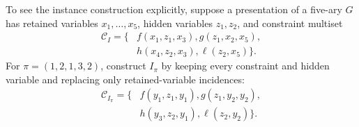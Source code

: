 \documentclass[11pt]{article}
\theoremstyle{plain}
\theoremstyle{definition}
\theoremstyle{remark}
\begin{document}
To see the instance construction explicitly, suppose a presentation of a
five-ary $G$ has retained variables $x_1,\ldots,x_5$, hidden variables
$z_1,z_2$, and constraint multiset
\begin{equation*}
\begin{aligned}
  \mathcal C_I=\{&f(x_1,z_1,x_3),
                  g(z_1,x_2,x_5),\\
                 &h(x_4,z_2,x_3),
                  \ell(z_2,x_5)\}.
\end{aligned}
\end{equation*}
For $\pi=(1,2,1,3,2)$, construct $I_\pi$ by keeping every constraint and
hidden variable and replacing only retained-variable incidences:
\[
\begin{aligned}
  \mathcal C_{I_\pi}=\{&f(y_1,z_1,y_1),
                        g(z_1,y_2,y_2),\\
                       &h(y_3,z_2,y_1),
                        \ell(z_2,y_2)\}.
\end{aligned}
\]
\end{document}
